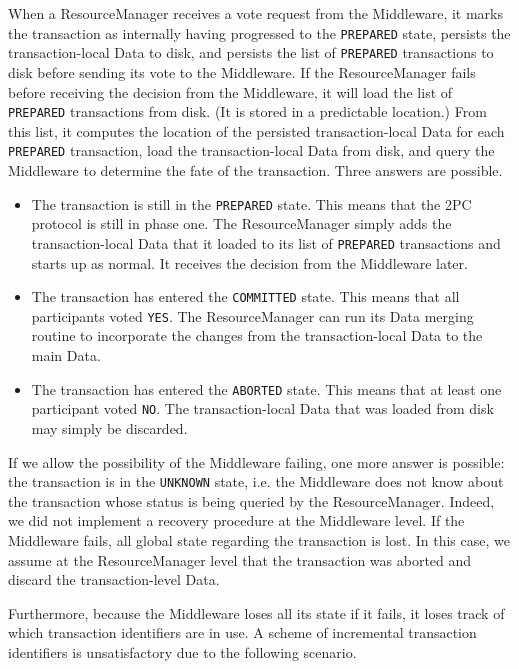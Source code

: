 \documentclass[letterpaper,11pt]{article}
\begin{document}
When a ResourceManager receives a vote request from the Middleware, it marks
the transaction as internally having progressed to the \texttt{PREPARED} state,
persists the transaction-local Data to disk, and persists the list of
\texttt{PREPARED} transactions to disk before sending its vote to the
Middleware. If the ResourceManager fails before receiving the decision from the
Middleware, it will load the list of \texttt{PREPARED} transactions from disk.
(It is stored in a predictable location.) From this list, it computes the
location of the persisted transaction-local Data for each \texttt{PREPARED}
transaction, load the transaction-local Data from disk, and query the
Middleware to determine the fate of the transaction. Three answers are
possible.
\begin{itemize}
    \item
        The transaction is still in the \texttt{PREPARED} state.
        This means that the 2PC protocol is still in phase one. The
        ResourceManager simply adds the transaction-local Data that it loaded
        to its list of \texttt{PREPARED} transactions and starts up as normal.
        It receives the decision from the Middleware later.

    \item
        The transaction has entered the \texttt{COMMITTED} state.
        This means that all participants voted \texttt{YES}. The
        ResourceManager can run its Data merging routine to incorporate the
        changes from the transaction-local Data to the main Data.

    \item
        The transaction has entered the \texttt{ABORTED} state.
        This means that at least one participant voted \texttt{NO}. The
        transaction-local Data that was loaded from disk may simply be
        discarded.
\end{itemize}

If we allow the possibility of the Middleware failing, one more answer is
possible: the transaction is in the \texttt{UNKNOWN} state, i.e. the Middleware
does not know about the transaction whose status is being queried by the
ResourceManager. Indeed, we did not implement a recovery procedure at the
Middleware level. If the Middleware fails, all global state regarding the
transaction is lost. In this case, we assume at the ResourceManager level that
the transaction was aborted and discard the transaction-level Data.

Furthermore, because the Middleware loses all its state if it fails, it loses
track of which transaction identifiers are in use. A scheme of incremental
transaction identifiers is unsatisfactory due to the following scenario.
\end{document}
